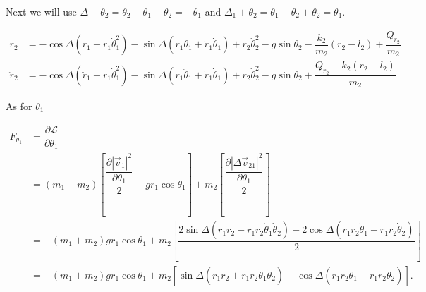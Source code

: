 \documentclass[12pt,a4paper,portrait]{article}
\newcommand{\lag}{\mathcal{L}}
\begin{document}
\begin{landscape}
Next we will use $\dot{\Delta} - \dot{\theta}_2 = \dot{\theta}_2-\dot{\theta}_1 - \dot{\theta}_2 = -\dot{\theta}_1$ and $\dot{\Delta}_1 + \dot{\theta}_2 = \dot{\theta}_1-\dot{\theta}_2 + \dot{\theta}_2 = \dot{\theta}_1$. 

\begin{align}
	\ddot{r}_2 &= - \cos{\Delta}(\ddot{r}_1 + r_1\dot{\theta}_1^2) - \sin{\Delta}(r_1\ddot{\theta}_1 + \dot{r}_1\dot{\theta}_1) + r_2\dot{\theta}_2^2-g\sin{\theta_2} - \dfrac{k_2}{m_2}(r_2-l_2) + \dfrac{Q_{r_2}}{m_2}\nonumber\\
	\ddot{r}_2 &=- \cos{\Delta}(\ddot{r}_1 + r_1\dot{\theta}_1^2) - \sin{\Delta}(r_1\ddot{\theta}_1 + \dot{r}_1\dot{\theta}_1) + r_2\dot{\theta}_2^2-g\sin{\theta_2}+\dfrac{Q_{r_2}-k_2(r_2-l_2)}{m_2}\label{r2ddotinit}
\end{align}

As for $\theta_1$

\begin{align*}
	F_{\theta_1} &= \dfrac{\partial \lag}{\partial \theta_1} \\
	&= (m_1+m_2)\left[\dfrac{\dfrac{\partial |\vec{v}_1|^2}{\partial \theta_1}}{2} - gr_1\cos{\theta_1}\right] + m_2\left[\dfrac{\dfrac{\partial |\Delta \vec{v}_{21}|^2}{\partial \theta_1}}{2}\right] \\
	&= -(m_1+m_2)gr_1\cos{\theta_1} + m_2\left[\dfrac{2\sin{\Delta}(\dot{r}_1\dot{r}_2 + r_1r_2\dot{\theta}_1\dot{\theta}_2) - 2\cos{\Delta}(r_1\dot{r}_2\dot{\theta}_1-\dot{r}_1r_2\dot{\theta}_2)}{2}\right] \\
	&= -(m_1+m_2)gr_1\cos{\theta_1} + m_2\left[\sin{\Delta}(\dot{r}_1\dot{r}_2 + r_1r_2\dot{\theta}_1\dot{\theta}_2) - \cos{\Delta}(r_1\dot{r}_2\dot{\theta}_1-\dot{r}_1r_2\dot{\theta}_2)\right].
\end{align*}


\end{landscape}
\end{document}

